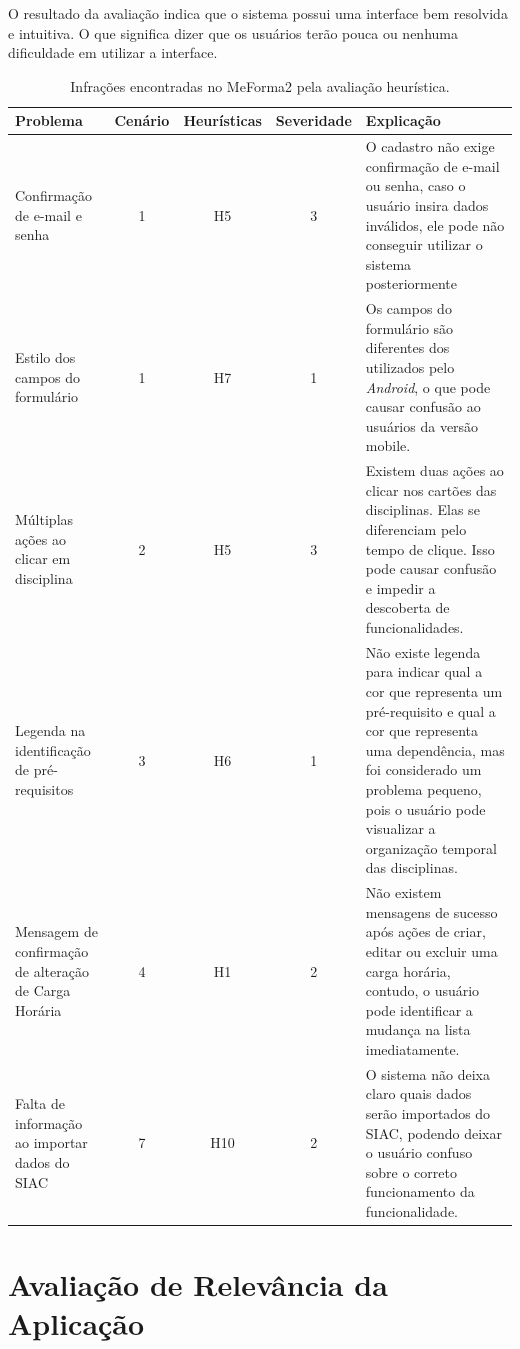 O resultado da avaliação indica que o sistema possui uma interface bem resolvida e intuitiva. O que significa dizer que os usuários terão pouca ou nenhuma dificuldade em utilizar a interface.

\begin{table}[H]
\begin{center}
\caption{Infrações encontradas no MeForma2 pela avaliação heurística.}
\begin{tabular}{ |p{3cm}|c|c|c|p{5.5cm}| }
\hline
 \textbf{Problema} & \textbf{Cenário} & \textbf{Heurísticas} & \textbf{Severidade} & \textbf{Explicação} \\ 
 \hline
 Confirmação de e-mail e senha & 1 & H5 & 3 & O cadastro não exige confirmação de e-mail ou senha, caso o usuário insira dados inválidos, ele pode não conseguir utilizar o sistema posteriormente \\
 \hline
 Estilo dos campos do formulário & 1 & H7 & 1 & Os campos do formulário são diferentes dos utilizados pelo \textit{Android}, o que pode causar confusão ao usuários da versão mobile. \\
 \hline
 Múltiplas ações ao clicar em disciplina & 2 & H5 & 3 & Existem duas ações ao clicar nos cartões das disciplinas. Elas se diferenciam pelo tempo de clique. Isso pode causar confusão e impedir a descoberta de funcionalidades. \\
 \hline
 Legenda na identificação de pré-requisitos & 3 & H6 & 1 & Não existe legenda para indicar qual a cor que representa um pré-requisito e qual a cor que representa uma dependência, mas foi considerado um problema pequeno, pois o usuário pode visualizar a organização temporal das disciplinas. \\
 \hline
 Mensagem de confirmação de alteração de Carga Horária & 4 & H1 & 2 & Não existem mensagens de sucesso após ações de criar, editar ou excluir uma carga horária, contudo, o usuário pode identificar a mudança na lista imediatamente. \\
 \hline
 Falta de informação ao importar dados do SIAC & 7 & H10 & 2 & O sistema não deixa claro quais dados serão importados do SIAC, podendo deixar o usuário confuso sobre o correto funcionamento da funcionalidade. \\
 \hline
\end{tabular}
\end{center}
\label{avaliacaoheuristica}

\end{table}

\section{Avaliação de Relevância da Aplicação}

